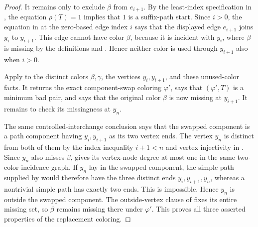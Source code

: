\begin{proof}
It remains only to exclude \(\beta\) from \(e_{i+1}\).  By the
least-index specification in , the equation
\(\rho(T)=1\) implies that \(1\) is a suffix-path start.  Since \(i>0\),
the equation in  at the zero-based edge
index \(i\) says that the displayed edge \(e_{i+1}\) joins \(y_i\) to
\(y_{i+1}\).  This edge cannot have color \(\beta\), because it is
incident with \(y_i\), where \(\beta\) is missing by the definitions
 and .  Hence neither
color is used through \(y_{i+1}\) also when \(i>0\).

Apply  to the distinct colors
\(\beta,\gamma\), the vertices \(y_i,y_{i+1}\), and these unused-color
facts.  It returns the exact component-swap coloring \(\varphi'\), says
that \((\varphi',T)\) is a minimum bad pair, and says that the original
color \(\beta\) is now missing at \(y_{i+1}\).  It remains to check its
missingness at \(y_n\).

The same controlled-interchange conclusion says that the swapped
component is a path component having \(y_i,y_{i+1}\) as its two vertex
ends.  The vertex \(y_n\) is distinct from both of them by the index
inequality \(i+1<n\) and vertex injectivity in .
Since \(y_n\) also misses \(\beta\),
 gives its vertex-node degree at
most one in the same two-color incidence graph.  If \(y_n\) lay in the
swapped component, the simple path supplied by
 would therefore have the three
distinct ends \(y_i,y_{i+1},y_n\), whereas a nontrivial simple path has
exactly two ends.  This is impossible.  Hence \(y_n\) is outside the
swapped component.  The outside-vertex clause of
 fixes its entire missing
set, so \(\beta\) remains missing there under \(\varphi'\).  This proves
all three asserted properties of the replacement coloring.
\end{proof}
